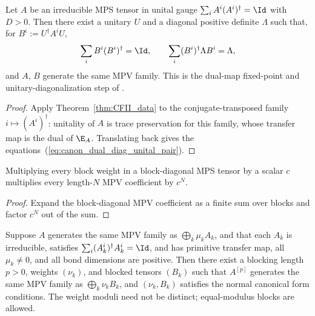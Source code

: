 \begin{theorem}%
    \label{thm:pgvwc07_dual_diag_unital}
    \leanok
    Let $A$ be an irreducible MPS tensor in unital gauge
    $\sum_i A^i(A^i)^\dagger=\Id$ with $D>0$. Then there exist a unitary $U$ and a
    diagonal positive definite $\Lambda$ such that, for $B^i:=U^\dagger A^iU$,
    \begin{equation}\label{eq:canon_dual_diag_unital_pair}
        \sum_i B^i(B^i)^\dagger=\Id,
        \qquad
        \sum_i (B^i)^\dagger\Lambda B^i=\Lambda,
    \end{equation}
    and $A$, $B$ generate the same MPV family. This is the dual-map fixed-point
    and unitary-diagonalization step of
    \cite[Theorem~4]{PerezGarcia2007Matrix}.
\end{theorem}

\begin{proof}\leanok
    Apply Theorem~\ref{thm:CFII_data} to the conjugate-transposed family
    $i\mapsto (A^i)^\dagger$: unitality of $A$ is trace preservation for this
    family, whose transfer map is the dual of $\E_A$. Translating back gives the
    equations~(\ref{eq:canon_dual_diag_unital_pair}).
\end{proof}

\begin{lemma}%
    \label{lem:mpv_to_tensor_from_blocks_weight_mul_left}
    \leanok
    Multiplying every block weight in a block-diagonal MPS tensor by a scalar $c$
    multiplies every length-$N$ MPV coefficient by $c^N$.
\end{lemma}

\begin{proof}\leanok
    Expand the block-diagonal MPV coefficient as a finite sum over blocks and
    factor $c^N$ out of the sum.
\end{proof}

\begin{theorem}%
    \label{thm:exists_normal_canonical_form}
    \leanok
    Suppose $A$ generates the same MPV family as $\bigoplus_k \mu_k A_k$, and that
    each $A_k$ is irreducible, satisfies $\sum_i (A_k^i)^\dagger A_k^i = \Id$, and
    has primitive transfer map, all $\mu_k \neq 0$, and all bond dimensions are
    positive. Then there exist a blocking length $p > 0$, weights $(\nu_k)$, and
    blocked tensors $(B_k)$ such that $A^{[p]}$ generates the same MPV family as
    $\bigoplus_k \nu_k B_k$, and $(\nu_k, B_k)$ satisfies the normal canonical
    form conditions. The weight moduli need not be distinct; equal-modulus blocks
    are allowed.
\end{theorem}

